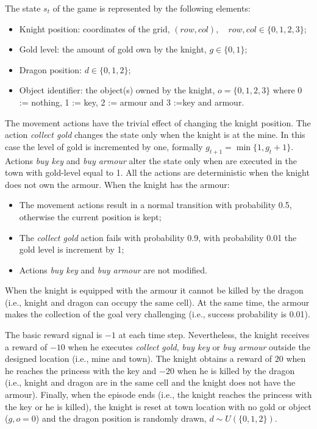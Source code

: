 \par
The state $s_t$ of the game is represented by the following elements:
\begin{itemize}
\item Knight position: coordinates of the grid, $(row,col), \quad row,col \in \{0,1,2,3\};$
\item Gold level: the amount of gold own by the knight, $g \in \{0,1\}$;
\item Dragon position: $d \in \{0,1,2\}$;
\item Object identifier: the object(s) owned by the knight, $o=\{0,1,2,3\}$ where 0 := nothing, 1 := key, 2 := armour and 3 :=key and armour.
\end{itemize}
The movement actions have the trivial effect of changing the knight position. The
action \emph{collect gold} changes the state only when the knight is at the mine. In this case the level of gold is incremented by one, formally $g_{t+1}= \min \{1,g_t + 1\}$. Actions \emph{buy key} and \emph{buy armour} alter the state only when are executed in the town with gold-level equal to 1. All the actions are deterministic when the knight does not own the armour. When the knight has the armour: 
\begin{itemize}
\item The movement actions result in a normal transition with probability 0.5, otherwise the current position is kept;
\item The \emph{collect gold} action fails with probability 0.9, \ie with probability 0.01 the gold level is increment by 1;
\item Actions \emph{buy key} and \emph{buy armour} are not modified.
\end{itemize}
When the knight is equipped with the armour it cannot be killed by the dragon (i.e., knight and dragon can occupy the same cell). At the same time, the armour makes the collection of the goal very challenging (i.e., success probability is 0.01).\par
The basic reward signal is $-1$ at each time step. Nevertheless, the knight receives a reward of $-10$ when he executes \emph{collect gold}, \emph{buy key} or \emph{buy armour} outside the designed location (i.e., mine and town).  The knight obtains a reward of $20$ when he reaches the princess with the key and $-20$ when he is killed by the dragon (i.e., knight and dragon are in the same cell and the knight
does not have the armour). Finally, when the episode ends (i.e., the knight reaches the princess with the key or he is killed), the knight is reset at town location with no gold or object ($g,o= 0$) and the dragon position is randomly drawn, $d \sim U(\{0,1,2\})$.
